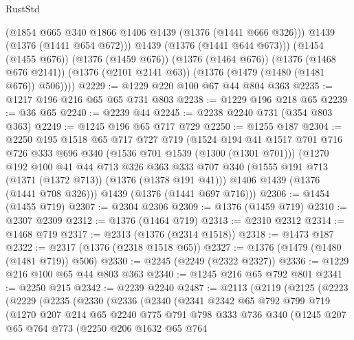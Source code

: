 \begin{lexlean}{RustStd}
\begin{coremodule}
            (@1854 @665 @340 @1866 @1406 @1439 (@1376 (@1441 @666 @326)))
            @1439
            (@1376 (@1441 @654 @672)))
          @1439
          (@1376 (@1441 @644 @673)))
        (@1454 (@1455 @676))
        (@1376 (@1459 @676))
        (@1376 (@1464 @676))
        (@1376 (@1468 @676 @2141))
        (@1376 (@2101 @2141 @63))
        (@1376 (@1479 (@1480 (@1481 @676)) @506))))
@2229 := @1229 @220 @100 @67 @44 @804 @363
@2235 := @1217 @196 @216 @65 @65 @731 @803
@2238 := @1229 @196 @218 @65
@2239 := @36 @65
@2240 := @2239 @44
@2245 := @2238 @2240 @731 (@354 @803 @363)
@2249 := @1245 @196 @65 @717 @729
@2250 := @1255 @187
@2304 := @2250
    @195
    @1518
    @65
    @717
    @727
    @719
    (@1524
      @194
      @41
      @1517
      @701
      @716
      @726
      @333
      @696
      @340
      (@1536 @701 @1539 (@1300 (@1301 @701)))
      (@1270
        @192
        @100
        @41
        @44
        @713
        @326
        @363
        @333
        @707
        @340
        (@1555 @191 @713 (@1371 (@1372 @713)) (@1376 (@1378 @191 @41)))
        @1406
        @1439
        (@1376 (@1441 @708 @326)))
      @1439
      (@1376 (@1441 @697 @716)))
@2306 := @1454 (@1455 @719)
@2307 := @2304 @2306
@2309 := @1376 (@1459 @719)
@2310 := @2307 @2309
@2312 := @1376 (@1464 @719)
@2313 := @2310 @2312
@2314 := @1468 @719
@2317 := @2313 (@1376 (@2314 @1518))
@2318 := @1473 @187
@2322 := @2317 (@1376 (@2318 @1518 @65))
@2327 := @1376 (@1479 (@1480 (@1481 @719)) @506)
@2330 := @2245 (@2249 (@2322 @2327))
@2336 := @1229 @216 @100 @65 @44 @803 @363
@2340 := @1245 @216 @65 @792 @801
@2341 := @2250 @215
@2342 := @2239 @2240
@2487 := @2113
    (@2119
      (@2125
        (@2223
          (@2229
            (@2235
              (@2330
                (@2336
                  (@2340
                    (@2341
                      @2342
                      @65
                      @792
                      @799
                      @719
                      (@1270
                        @207
                        @214
                        @65
                        @2240
                        @775
                        @791
                        @798
                        @333
                        @736
                        @340
                        (@1245
                          @207
                          @65
                          @764
                          @773
                          (@2250
                            @206
                            @1632
                            @65
                            @764

\end{coremodule}
\end{lexlean}

